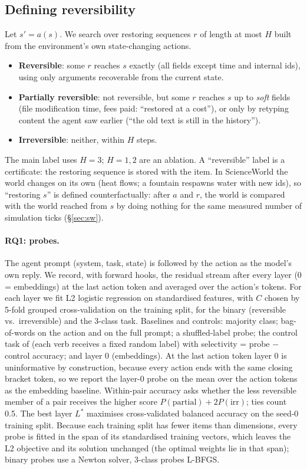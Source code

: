 \documentclass[11pt]{article}
\begin{document}
\subsection{Defining reversibility}
\label{sec:def}
Let $s' = a(s)$. We search over restoring sequences $r$ of length at most $H$ built from the environment's own state-changing actions.
\begin{itemize}\itemsep0pt
\item \textbf{Reversible}: some $r$ reaches $s$ exactly (all fields except time and internal ids), using only arguments recoverable from the current state.
\item \textbf{Partially reversible}: not reversible, but some $r$ reaches $s$ up to \emph{soft} fields (file modification time, fees paid: ``restored at a cost''), or only by retyping content the agent saw earlier (``the old text is still in the history'').
\item \textbf{Irreversible}: neither, within $H$ steps.
\end{itemize}
The main label uses $H=3$; $H=1,2$ are an ablation. A ``reversible'' label is a certificate: the restoring sequence is stored with the item. In ScienceWorld the world changes on its own (heat flows; a fountain respawns water with new ids), so ``restoring $s$'' is defined counterfactually: after $a$ and $r$, the world is compared with the world reached from $s$ by doing nothing for the same measured number of simulation ticks (\S\ref{sec:sw}).

\paragraph{RQ1: probes.} The agent prompt (system, task, state) is followed by the action as the model's own reply. We record, with forward hooks, the residual stream after every layer (0 = embeddings) at the last action token and averaged over the action's tokens. For each layer we fit L2 logistic regression on standardised features, with $C$ chosen by 5-fold grouped cross-validation on the training split, for the binary (reversible vs.\ irreversible) and the 3-class task. Baselines and controls: majority class; bag-of-words on the action and on the full prompt; a shuffled-label probe; the control task of \citet{hewitt2019controltasks} (each verb receives a fixed random label) with selectivity = probe $-$ control accuracy; and layer 0 (embeddings). At the last action token layer 0 is uninformative by construction, because every action ends with the same closing bracket token, so we report the layer-0 probe on the mean over the action tokens as the embedding baseline. Within-pair accuracy asks whether the less reversible member of a pair receives the higher score $P(\text{partial}) + 2P(\text{irr})$; ties count 0.5. The best layer $L^\ast$ maximises cross-validated balanced accuracy on the seed-0 training split. Because each training split has fewer items than dimensions, every probe is fitted in the span of its standardised training vectors, which leaves the L2 objective and its solution unchanged (the optimal weights lie in that span); binary probes use a Newton solver, 3-class probes L-BFGS.
\end{document}
